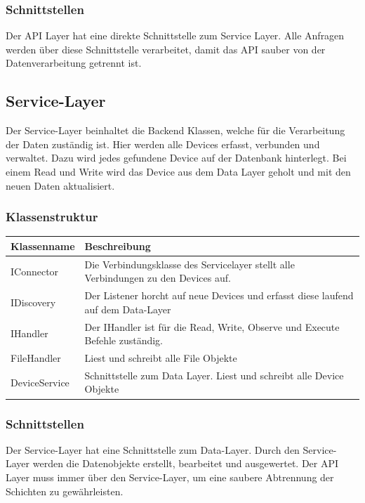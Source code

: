\subsubsection{Schnittstellen}
Der API Layer hat eine direkte Schnittstelle zum Service Layer. Alle Anfragen werden über diese Schnittstelle verarbeitet, damit das API sauber von der Datenverarbeitung getrennt ist. 


\subsection{Service-Layer}
Der Service-Layer beinhaltet die Backend Klassen, welche für die Verarbeitung der Daten zuständig ist. Hier werden alle Devices erfasst, verbunden und verwaltet. Dazu wird jedes gefundene Device auf der Datenbank hinterlegt. Bei einem Read und Write wird das Device aus dem Data Layer geholt und mit den neuen Daten aktualisiert.
\subsubsection{Klassenstruktur}
\begin{table}[H]
\centering
    \begin{tabular}{@{}l p{14.1cm} @{}}\toprule    
    {Klassenname} & {Beschreibung}\\ \midrule
     IConnector & Die Verbindungsklasse des Servicelayer stellt alle Verbindungen zu den Devices auf.  \\       
     IDiscovery & Der Listener horcht auf neue Devices und erfasst diese laufend auf dem Data-Layer  \\       
     IHandler &  Der IHandler ist für die Read, Write, Observe und Execute Befehle zuständig.\\       
     FileHandler &   Liest und schreibt alle File Objekte\\       
     DeviceService &  Schnittstelle zum Data Layer. Liest und schreibt alle Device Objekte \\       
    \bottomrule
    \end{tabular}
\end{table}
\subsubsection{Schnittstellen}
Der Service-Layer hat eine Schnittstelle zum Data-Layer. Durch den Service-Layer werden die Datenobjekte erstellt, bearbeitet und ausgewertet. Der API Layer muss immer über den Service-Layer, um eine saubere Abtrennung der Schichten zu gewährleisten.

